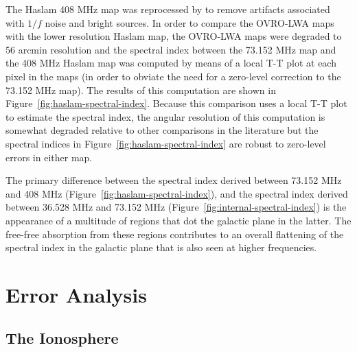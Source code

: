 \documentclass[twocolumn]{aastex61}
\begin{document}
The Haslam 408 MHz map \citep{1981A&A...100..209H, 1982A&AS...47....1H} was reprocessed by
\citet{2015MNRAS.451.4311R} to remove artifacts associated with $1/f$ noise and bright sources. In
order to compare the OVRO-LWA maps with the lower resolution Haslam map, the OVRO-LWA maps were
degraded to 56 arcmin resolution and the spectral index between the 73.152 MHz map and the 408 MHz
Haslam map was computed by means of a local T-T plot at each pixel in the maps (in order to obviate
the need for a zero-level correction to the 73.152 MHz map). The results of this computation are
shown in Figure~\ref{fig:haslam-spectral-index}. Because this comparison uses a local T-T plot to
estimate the spectral index, the angular resolution of this computation is somewhat degraded
relative to other comparisons in the literature but the spectral indices in
Figure~\ref{fig:haslam-spectral-index} are robust to zero-level errors in either map.

The primary difference between the spectral index derived between 73.152 MHz and 408 MHz
(Figure~\ref{fig:haslam-spectral-index}), and the spectral index derived between 36.528 MHz and
73.152 MHz (Figure~\ref{fig:internal-spectral-index}) is the appearance of a multitude of 
regions that dot the galactic plane in the latter. The free-free absorption from these 
regions contributes to an overall flattening of the spectral index in the galactic plane that is
also seen at higher frequencies.


\section{Error Analysis}\label{sec:error}

\subsection{The Ionosphere}\label{sec:ionosphere}
\end{document}

